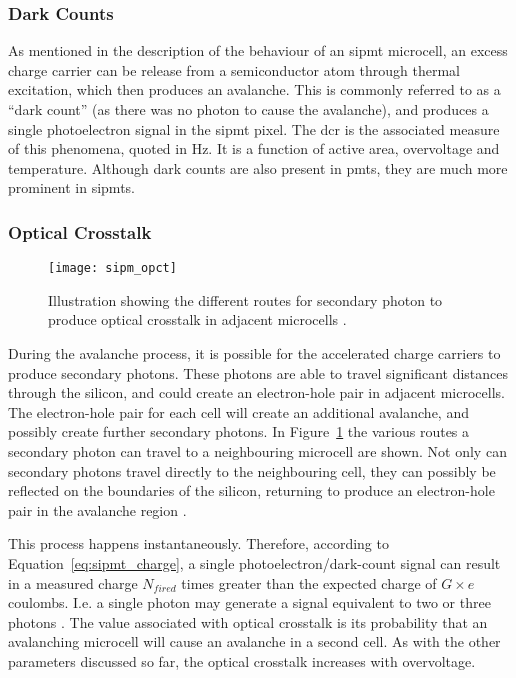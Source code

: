\subsubsection{Dark Counts}

As mentioned in the description of the behaviour of an \gls{sipmt} microcell, an excess charge carrier can be release from a semiconductor atom through thermal excitation, which then produces an avalanche. This is commonly referred to as a ``dark count'' (as there was no photon to cause the avalanche), and produces a single photoelectron signal in the \gls{sipmt} pixel. The \gls{dcr} is the associated measure of this phenomena, quoted in \si{Hz}. It is a function of active area, overvoltage and temperature. Although dark counts are also present in \glspl{pmt}, they are much more prominent in \glspl{sipmt}.

\subsubsection{Optical Crosstalk}

\begin{figure}
	\centering
    \texttt{[image: sipm\_opct]} 
	\caption[Illustration of the possible ways optical crosstalk is produced.]{Illustration showing the different routes for secondary photon to produce optical crosstalk in adjacent microcells \cite{Rech2008}.}
	\label{fig:sipm_opct}
\end{figure}

During the avalanche process, it is possible for the accelerated charge carriers to produce secondary photons. These photons are able to travel significant distances through the silicon, and could create an electron-hole pair in adjacent microcells. The electron-hole pair for each cell will create an additional avalanche, and possibly create further secondary photons. In Figure~\ref{fig:sipm_opct} the various routes a secondary photon can travel to a neighbouring microcell are shown. Not only can secondary photons travel directly to the neighbouring cell, they can possibly be reflected on the boundaries of the silicon, returning to produce an electron-hole pair in the avalanche region \cite{Rech2008}.

This process happens instantaneously. Therefore, according to Equation~\ref{eq:sipmt_charge}, a single photoelectron/dark-count signal can result in a measured charge $N_{fired}$ times greater than the expected charge of $G \times e$ coulombs. I.e. a single photon may generate a signal equivalent to two or three photons \cite{SensL2011}. The value associated with optical crosstalk is its probability that an avalanching microcell will cause an avalanche in a second cell. As with the other parameters discussed so far, the optical crosstalk increases with overvoltage.

